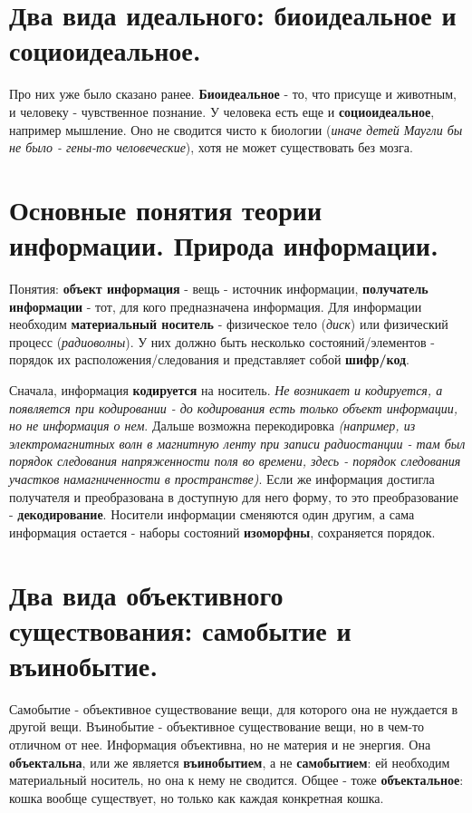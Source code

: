 \section{ Два вида идеального: биоидеальное и социоидеальное.}
Про них уже было сказано ранее. \textbf{Биоидеальное} - то, что присуще и животным, и человеку - чувственное познание. У человека есть еще и \textbf{социоидеальное}, например мышление. Оно не сводится чисто к биологии (\textit{иначе детей Маугли бы не было - гены-то человеческие}), хотя не может существовать без мозга.

\section{ Основные понятия теории информации. Природа информации.}
Понятия: \textbf{объект информация} - вещь - источник информации, \textbf{получатель информации} - тот, для кого предназначена информация. Для информации необходим \textbf{материальный носитель} - физическое тело (\textit{диск}) или физический процесс (\textit{радиоволны}). У них должно быть несколько состояний/элементов - порядок их расположения/следования и представляет собой \textbf{шифр/код}. 

Сначала, информация \textbf{кодируется} на носитель. \textit{Не возникает и кодируется, а появляется при кодировании - до кодирования есть только объект информации, но не информация о нем}. Дальше возможна перекодировка \textit{(например, из электромагнитных волн в магнитную ленту при записи радиостанции - там был порядок следования напряженности поля во времени, здесь - порядок следования участков намагниченности в пространстве)}. Если же информация достигла получателя и преобразована в доступную для него форму, то это преобразование - \textbf{декодирование}. Носители информации сменяются один другим, а сама информация остается - наборы состояний \textbf{изоморфны}, сохраняется порядок.

\section{ Два вида объективного существования: самобытие и въинобытие.}
Самобытие - объективное существование вещи, для которого она не нуждается в другой вещи. Въинобытие - объективное существование вещи, но в чем-то отличном от нее.
Информация объективна, но не материя и не энергия. Она \textbf{объектальна}, или же является \textbf{въинобытием}, а не \textbf{самобытием}: ей необходим материальный носитель, но она к нему не сводится. Общее - тоже \textbf{объектальное}: кошка вообще существует, но только как каждая конкретная кошка.


